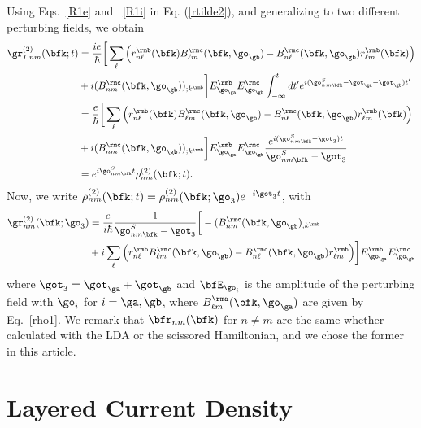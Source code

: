 \documentclass[floatfix,prb,aps,superscriptaddress,11pt,preprint,letterpaper]{revtex4}
\begin{document}
Using Eqs.~\eqref{R1e} and ~\eqref{R1i} in Eq. (\ref{rtilde2}),
and generalizing to two different perturbing fields,
we obtain
\begin{align}\label{rtilde33}
\gr^{(2)}_{I,nm}(\bfk;t)
&=
\frac{ie}{\hbar}
\bigg[
\sum_{\ell}
\Big(
r^{\rmb}_{n\ell}(\bfk)
B^{\rmc}_{\ell m}(\bfk,\go_\gb)
-
B^{\rmc}_{n\ell}(\bfk,\go_\gb)
r^{\rmb}_{\ell m}(\bfk)
\Big)
\nonumber \\
&+
i
(B^{\rmc}_{nm}(\bfk,\go_\gb))_{;k^{\rmb}}
\bigg]
E^{\rmb}_{\go_\ga}E_{\go_\gb}^{\rmc}
\int_{-\infty}^t dt'
e^{i(\go^S_{nm\bfk}-\got_\ga-\got_\gb)t'}
\nonumber \\
&=
\frac{e}{\hbar}
\bigg[
\sum_{\ell}
\Big(
r^{\rmb}_{n\ell}(\bfk)
B^{\rmc}_{\ell m}(\bfk,\go_\gb)
-
B^{\rmc}_{n\ell}(\bfk,\go_\gb)
r^{\rmb}_{\ell m}(\bfk)
\Big)
\nonumber \\
&+
i
(B^{\rmc}_{nm}(\bfk,\go_\gb))_{;k^{\rmb}}
\bigg]
E^{\rmb}_{\go_\ga}E_{\go_\gb}^{\rmc}
\frac{e^{i(\go^S_{nm\bfk}-\got_3)t}}
{\go^S_{nm\bfk}-\got_3}
\nonumber \\
&=
e^{i\go^S_{nm\bfk}t}
\rho_{nm}^{(2)}(\bfk;t)
.
\end{align}
Now, we write
$\rho_{nm}^{(2)}(\bfk;t)=\rho_{nm}^{(2)}(\bfk;\go_3)e^{-i\got_3 t}$,
with
\begin{align}\label{rho2}
\gr_{nm}^{(2)}(\bfk;\go_3)&=\frac{e}{i\hbar}\frac{1}{\go^S_{nm\bfk}-\got_3}
\bigg[-(B_{nm}^{\rmc}(\bfk,\go_\gb)_{;k^{\rmb}}
\nonumber \\
&
+i\sum_\ell\Big(r_{n\ell}^{\rmb}B_{\ell m}^{\rmc}(\bfk,\go_\gb) - B_{n\ell}^{\rmc}(\bfk,\go_\gb)
  r_{\ell m}^{\rmb}\Big)
\bigg] 
E^{\rmb}_{\go_\ga}E_{\go_\gb}^{\rmc}
\end{align} 
where $\got_3=\got_\ga+\got_\gb$ and $\bfE_{\go_i}$ is the amplitude of the perturbing
field with $\go_i$ for $i=\ga,\gb$, where $B_{\ell
  m}^{\rma}(\bfk,\go_\ga)$ are given by 
Eq.~\eqref{rho1}. We remark that $\bfr_{nm}(\bfk)$ for $n\ne m$ are
the same whether calculated with the LDA or the scissored Hamiltonian,
and we chose the former in this article.

\section{Layered Current Density}\label{cd}
\end{document}
